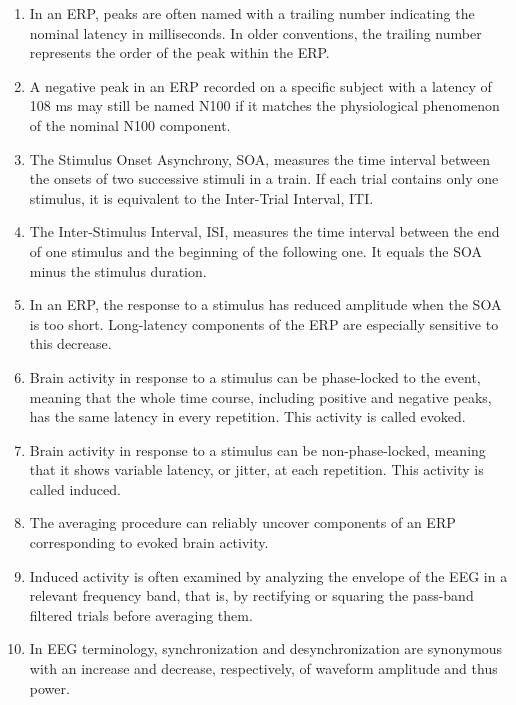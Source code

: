 \begin{enumerate}[label=\arabic*.]
    \item In an ERP, peaks are often named with a trailing number indicating the nominal latency in milliseconds. In older conventions, the trailing number represents the order of the peak within the ERP.
    
    \item A negative peak in an ERP recorded on a specific subject with a latency of 108 ms may still be named N100 if it matches the physiological phenomenon of the nominal N100 component.
    
    \item The Stimulus Onset Asynchrony, SOA, measures the time interval between the onsets of two successive stimuli in a train. If each trial contains only one stimulus, it is equivalent to the Inter-Trial Interval, ITI.
    
    \item The Inter-Stimulus Interval, ISI, measures the time interval between the end of one stimulus and the beginning of the following one. It equals the SOA minus the stimulus duration.
    
    \item In an ERP, the response to a stimulus has reduced amplitude when the SOA is too short. Long-latency components of the ERP are especially sensitive to this decrease.
    
    \item Brain activity in response to a stimulus can be phase-locked to the event, meaning that the whole time course, including positive and negative peaks, has the same latency in every repetition. This activity is called evoked.
    
    \item Brain activity in response to a stimulus can be non-phase-locked, meaning that it shows variable latency, or jitter, at each repetition. This activity is called induced.
    
    \item The averaging procedure can reliably uncover components of an ERP corresponding to evoked brain activity.
    
    \item Induced activity is often examined by analyzing the envelope of the EEG in a relevant frequency band, that is, by rectifying or squaring the pass-band filtered trials before averaging them.
    
    \item In EEG terminology, synchronization and desynchronization are synonymous with an increase and decrease, respectively, of waveform amplitude and thus power.
    

\end{enumerate}
